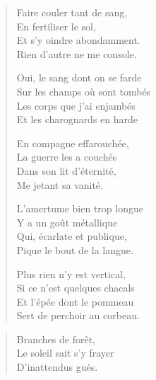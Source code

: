 \begin{verse}\quatrain
  Faire couler tant de sang,\\  %
  En fertiliser le sol,\\  %
  Et s’y oindre abondamment.\\  %
  Rien d’autre ne me console.

  Oui, le sang dont on se farde\\  %
  Sur les champs où sont tombés\\  %
  Les corps que j’ai enjambés\\  %
  Et les charognards en harde

  En compagne effarouchée,\\  %
  La guerre les a couchés\\  %
  Dans son lit d’éternité,\\  %
  Me jetant sa vanité.

  L’amertume bien trop longue\\  %
  Y a un goût métallique\\  %
  Qui, écarlate et publique,\\  %
  Pique le bout de la langue.

  Plus rien n’y est vertical,\\  %
  Si ce n’est quelques chacals\\  %
  Et l’épée dont le pommeau\\  %
  Sert de perchoir au corbeau.
\end{verse}

\begin{verse}\haiku
  Branches de forêt,\\  %
  Le soleil sait s’y frayer\\  %
  D’inattendus gués.
\end{verse}

